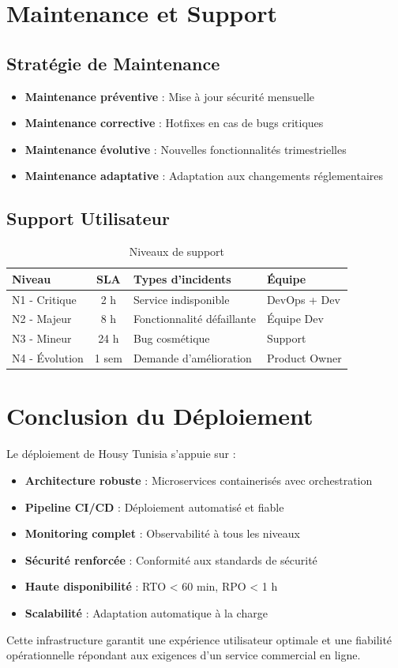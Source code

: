 \section{Maintenance et Support}

\subsection{Stratégie de Maintenance}

\begin{itemize}
    \item \textbf{Maintenance préventive} : Mise à jour sécurité mensuelle
    \item \textbf{Maintenance corrective} : Hotfixes en cas de bugs critiques
    \item \textbf{Maintenance évolutive} : Nouvelles fonctionnalités trimestrielles
    \item \textbf{Maintenance adaptative} : Adaptation aux changements réglementaires
\end{itemize}

\subsection{Support Utilisateur}

\begin{table}[H]
\centering
\caption{Niveaux de support}
\begin{tabular}{|l|c|l|l|}
\hline
\textbf{Niveau} & \textbf{SLA} & \textbf{Types d'incidents} & \textbf{Équipe} \\
\hline
N1 - Critique & 2 h & Service indisponible & DevOps + Dev \\
N2 - Majeur & 8 h & Fonctionnalité défaillante & Équipe Dev \\
N3 - Mineur & 24 h & Bug cosmétique & Support \\
N4 - Évolution & 1 sem & Demande d'amélioration & Product Owner \\
\hline
\end{tabular}
\label{tab:niveaux_support}
\end{table}

\section{Conclusion du Déploiement}

Le déploiement de Housy Tunisia s'appuie sur :

\begin{itemize}
    \item \textbf{Architecture robuste} : Microservices containerisés avec orchestration
    \item \textbf{Pipeline CI/CD} : Déploiement automatisé et fiable
    \item \textbf{Monitoring complet} : Observabilité à tous les niveaux
    \item \textbf{Sécurité renforcée} : Conformité aux standards de sécurité
    \item \textbf{Haute disponibilité} : RTO < 60 min, RPO < 1 h
    \item \textbf{Scalabilité} : Adaptation automatique à la charge
\end{itemize}

Cette infrastructure garantit une expérience utilisateur optimale et une fiabilité opérationnelle répondant aux exigences d'un service commercial en ligne.
